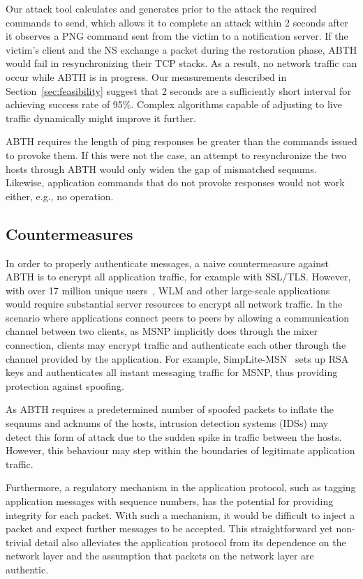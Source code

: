 \documentclass{sig-alternate}
\begin{document}
Our attack tool calculates and generates prior to the attack the required commands to send, which allows it to complete an attack within 2 seconds after it observes a PNG command sent from the victim to a notification server.
If the victim's client and the NS exchange a packet during the restoration phase, ABTH would fail in resynchronizing their TCP stacks.
As a result, no network traffic can occur while ABTH is in progress. 
Our measurements described in Section~\ref{sec:feasibility} suggest that 2 seconds are a sufficiently short interval for achieving success rate of 95\%.
Complex algorithms capable of adjusting to live traffic dynamically might improve it further. 

ABTH requires the length of ping responses be greater than the commands issued to provoke them.
If this were not the case, an attempt to resynchronize the two hosts through ABTH would only widen the gap of mismatched seqnums.
Likewise, application commands that do not provoke responses would not work either, e.g., no operation.

\subsection{Countermeasures}

In order to properly authenticate messages, a naive countermeasure against ABTH is to encrypt all application traffic, for example with SSL/TLS.
However, with over 17 million unique users~\cite{templeton:spoof}, WLM and other large-scale applications would require substantial server resources to encrypt all network traffic.
In the scenario where applications connect peers to peers by allowing a communication channel between two clients, as MSNP implicitly does through the mixer connection, clients may encrypt traffic and authenticate each other through the channel provided by the application.
For example, SimpLite-MSN~\cite{secway:url} sets up RSA keys and authenticates all instant messaging traffic for MSNP, thus providing protection against spoofing.

As ABTH requires a predetermined number of spoofed packets to inflate the seqnums and acknums of the hosts, intrusion detection systems (IDSs) may detect this form of attack due to the sudden spike in traffic between the hosts.
However, this behaviour may step within the boundaries of legitimate application traffic.

Furthermore, a regulatory mechanism in the application protocol, such as tagging application messages with sequence numbers, has the potential for providing integrity for each packet.
With such a mechanism, it would be difficult to inject a packet and expect further messages to be accepted.
This straightforward yet non-trivial detail also alleviates the application protocol from its dependence on the network layer and the assumption that packets on the network layer are authentic.
\end{document}
